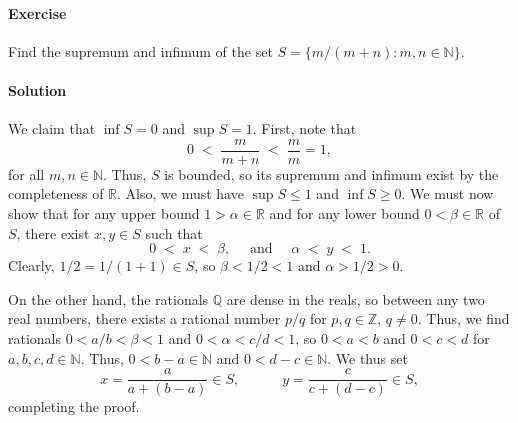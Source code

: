 \documentclass[10pt]{article}
\newcounter{prob}
\def\problem{\stepcounter{prob}\paragraph{Exercise \arabic{prob}}}
\def\solution{\paragraph{Solution}}
\begin{document}
        \problem Find the supremum and infimum of the set $S = \{m/(m + n) : m, n \in \mathbb{N}\}$.
        \solution We claim that $\inf S = 0$ and $\sup S = 1$. First, note that 
        \[
                0 \;<\; \frac{m}{m + n} \;<\; \frac{m}{m} = 1,
        \]
        for all $m, n \in \mathbb{N}$. Thus, $S$ is bounded, so its supremum and infimum exist by the completeness of $\mathbb{R}$.
        Also, we must have $\sup S \leq 1$ and $\inf S \geq 0$. We must now show that for any upper bound $1 > \alpha \in \mathbb{R}$
        and for any lower bound $0 < \beta \in \mathbb{R}$ of $S$, there exist $x, y \in S$ such that
        \[
                0 \;<\; x \;<\; \beta, \quad\text{ and }\quad \alpha \;<\; y \;<\; 1.
        \]
        Clearly, $1 /2 = 1 /(1 + 1) \in S$, so $\beta < 1 /2 < 1$ and $\alpha > 1 /2 > 0$.

        On the other hand, the rationals $\mathbb{Q}$ are dense in the reals, so between any two real numbers, there exists a rational
        number $p /q$ for $p, q \in \mathbb{Z}$, $q \neq 0$. Thus, we find rationals $0 < a /b < \beta < 1$ and $0 < \alpha < c /d < 1$,
        so $0 < a < b$ and $0 < c < d$ for $a, b, c, d \in \mathbb{N}$. Thus, $0 < b - a \in \mathbb{N}$ and $0 < d - c \in \mathbb{N}$.
        We thus set
        \[
                x = \frac{a}{a + (b - a)} \in S, \quad\quad\quad y = \frac{c}{c + (d - c)} \in S,
        \]
        completing the proof.
\end{document}
